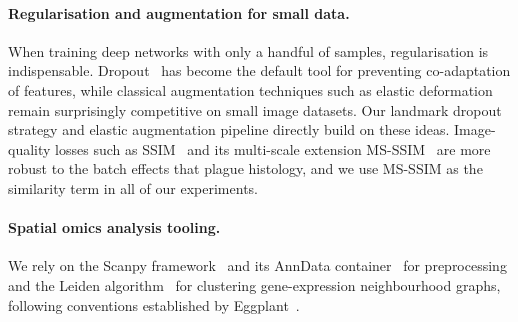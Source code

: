 \paragraph{Regularisation and augmentation for small data.} When training deep networks with only a handful of samples, regularisation is indispensable. Dropout~\cite{dropout2014hinton} has become the default tool for preventing co-adaptation of features, while classical augmentation techniques such as elastic deformation~\cite{simard2003best} remain surprisingly competitive on small image datasets. Our landmark dropout strategy and elastic augmentation pipeline directly build on these ideas. Image-quality losses such as SSIM~\cite{wang2004image} and its multi-scale extension MS-SSIM~\cite{wang2003multiscale} are more robust to the batch effects that plague histology, and we use MS-SSIM as the similarity term in all of our experiments.

\paragraph{Spatial omics analysis tooling.} We rely on the Scanpy framework~\cite{wolf2018scanpy} and its AnnData container~\cite{virshup2024anndata} for preprocessing and the Leiden algorithm~\cite{traag2019louvain} for clustering gene-expression neighbourhood graphs, following conventions established by Eggplant~\cite{bergenstrahle2021eggplant}.
